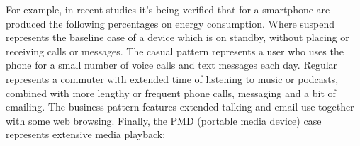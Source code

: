 \documentclass[conference]{IEEEtran}
\begin{document}
 For example, in recent studies \cite{CarrollAnalysis} it's being verified that for a smartphone are produced the following percentages on energy consumption. Where suspend represents the baseline case of a device which is on standby, without placing or receiving calls or messages. The casual pattern represents a user who uses the phone for a small number of voice calls and text messages each day. Regular represents a commuter with extended time of listening to music or podcasts, combined with more lengthy or frequent phone calls, messaging and a bit of emailing. The business pattern features extended talking and email use together with some web browsing. Finally, the PMD (portable media device) case represents extensive media playback:

\begin{table}[h]
\caption {Usage patterns, showing total time for each activity in minutes \cite{CarrollAnalysis}.}
\end{table}
  
\end{document}
